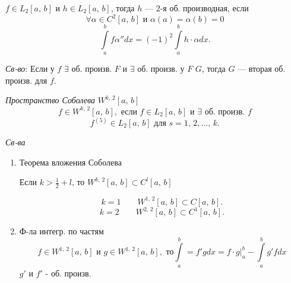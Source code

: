 \begin{dfn}
	$f \in  L_2[a,\,b]$ и $h \in  L_2 [a,\,b]$, тогда $h$ ---
	2-я об. производная, если
	 \[
	 \forall \alpha \in C^2[a,\,b] \text{ и }
	 \alpha(a)=\alpha(b)=0
	 \] 
	\[
		\int\limits_{a}^{b} f \alpha'' dx=(-1)^2
		\int\limits_{a}^{b} h \cdot \alpha dx  
	.\] 
\end{dfn}
\emph{Св-во}: Если у $f$  $\exists$ об. произв.  $F$  и  $\exists$
об. произв. у  $F$  $G$, тогда  $G$ --- вторая об. произв. для  $f$.

 \begin{dfn}
	 \emph{Пространство Соболева} $W^{k,\,2}[a,\,b]$
	 \[
		 f \in  W^{k,\,2}[a,\,b], \text{ если } f \in 
		 L_2[a,\,b] \text{ и } \exists \text{ об. произв.
		 } f
	 \]
	 \[
		 f^{(5)} \in  L_2[a,\,b] \text{ для } s=1,\,2, \ldots,\, k
	 .\] 
\end{dfn}
\emph{Св-ва}
\begin{enumerate}
	\item Теорема вложения Соболева

		Если $k> \frac{1}{2}+l$, то $W^{k,\,2}[a,\,b]\subset
		C^l [a,\,b]$ 

	\[
		k=1 \qquad W^{1,\,2}[a,\,b] \subset C[a,\,b]
	.\] 
	\[
		k=2 \qquad W^{2,\,2}[a,\,b]\subset C^1[a,\,b]
	.\] 
	\item Ф-ла интегр. по частям
		\[
			f \in  W^{1,\,2}[a,\,b] \text{ и }
			g \in W^{1,\,2}[a,\,b], \text{ то}
			\int\limits_{a}^{b}  =
			f' g dx=f \cdot g\left. \right|_a^b- \int\limits_{a}^{b}g' f dx  
		\] 
		$g'$ и $f'$ - об. произв. 
\end{enumerate}
